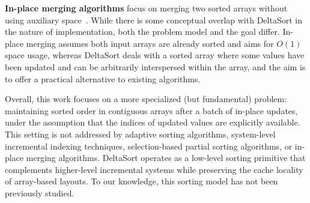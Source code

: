 \textbf{In-place merging algorithms} focus on merging two sorted arrays without using auxiliary space~\cite{kronrod1969optimal, 10.1145/42392.42403}. While there is some conceptual overlap with DeltaSort in the nature of implementation, both the problem model and the goal differ. In-place merging assumes both input arrays are already sorted and aims for $O(1)$ space usage, whereas DeltaSort deals with a sorted array where some values have been updated and can be arbitrarily interspersed within the array, and the aim is to offer a practical alternative to existing algorithms.

Overall, this work focuses on a more specialized (but fundamental) problem: maintaining sorted order in contiguous arrays after a batch of in-place updates, under the assumption that the indices of updated values are explicitly available. This setting is not addressed by adaptive sorting algorithms, system-level incremental indexing techniques, selection-based partial sorting algorithms, or in-place merging algorithms. DeltaSort operates as a low-level sorting primitive that complements higher-level incremental systems while preserving the cache locality of array-based layouts. To our knowledge, this sorting model has not been previously studied.